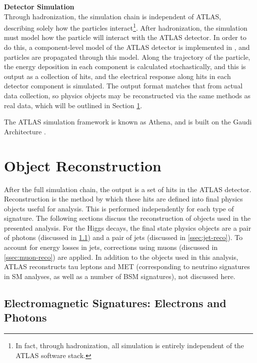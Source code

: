 \noindent\textbf{Detector Simulation}\\
\indent Through hadronization, the simulation chain is independent of ATLAS, describing solely how the particles interact\footnote{In fact, through hadronization, all simulation is entirely independent of the ATLAS software stack.}. After hadronization, the simulation must model how the particle will interact with the ATLAS detector. In order to do this, a component-level model of the ATLAS detector is implemented in \GEANTFOUR \cite{geant4}, and particles are propagated through this model. Along the trajectory of the particle, the energy deposition in each component is calculated stochastically, and this is output as a collection of hits, and the electrical response along hits in each detector component is simulated. The output format matches that from actual data collection, so physics objects may be reconstructed via the same methods as real data, which will be outlined in Section \ref{sec:reconstruction}.

The ATLAS simulation framework is known as Athena, and is built on the Gaudi Architecture \cite{gaudi}.

\section{Object Reconstruction} \label{sec:reconstruction}

After the full simulation chain, the output is a set of hits in the ATLAS detector. Reconstruction is the method by which these hits are defined into final physics objects useful for analysis. This is performed independently for each type of signature. The following sections discuss the reconstruction of objects used in the presented analysis. For the Higgs decays, the final state physics objects are a pair of photons (discussed in \ref{ssec:em-signatures}) and a pair of jets (discussed in \ref{ssec:jet-reco}). To account for energy losses in jets, corrections using muons (discussed in \ref{ssec:muon-reco}) are applied. In addition to the objects used in this analysis, ATLAS reconstructs tau leptons and \gls{MET} (corresponding to neutrino signatures in \gls{SM} analyses, as well as a number of \gls{BSM} signatures), not discussed here.

\subsection{Electromagnetic Signatures: Electrons and Photons} \label{ssec:em-signatures} %

